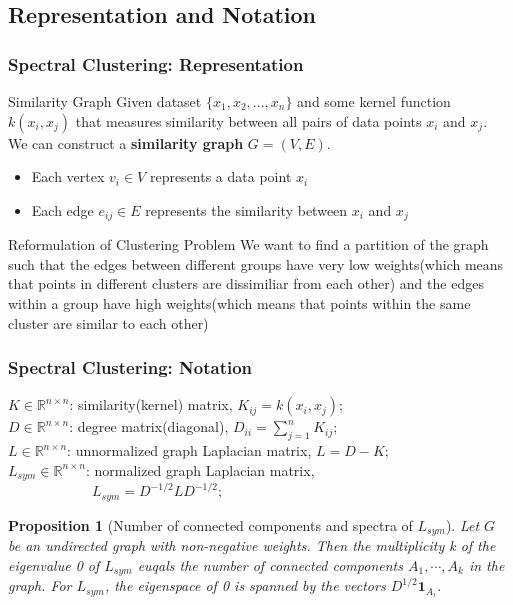 \documentclass{beamer}
\newtheorem{proposition}[theorem]{Proposition}
\begin{document}
\subsection{Representation and Notation}
\begin{frame}
\frametitle{Spectral Clustering: Representation}
\begin{block}{Similarity Graph}
Given dataset $\{x_1,x_2,..., x_n\}$ and some kernel function $k(x_i,x_j)$ that measures similarity between all pairs of data points $x_i$ and $x_j$.\\
We can construct a \textbf{similarity graph} $G=(V,E)$.\\
\begin{itemize}
	\item{Each vertex $v_i\in V$ represents a data point $x_i$}
	\item{Each edge $e_{ij}\in E$ represents the similarity between $x_i$ and $x_j$}
\end{itemize}
\end{block}
\begin{block}{Reformulation of Clustering Problem}
We want to find a partition of the graph such that the edges between different groups have very low weights(which means that points in different clusters are dissimiliar from each other) and the edges within a group have high weights(which means that points within the same cluster are similar to each other)
\end{block}
\end{frame}

\begin{frame}
\frametitle{Spectral Clustering: Notation}
$K\in \mathbb{R}^{n\times n}$: similarity(kernel) matrix, $K_{ij}=k(x_i,x_j)$;\\
$D\in \mathbb{R}^{n\times n}$: degree matrix(diagonal), $D_{ii}=\sum_{j=1}^{n}K_{ij}$;\\
$L\in \mathbb{R}^{n\times n}$: unnormalized graph Laplacian matrix, $L=D-K$;\\
$L_{sym}\in \mathbb{R}^{n\times n}$: normalized graph Laplacian matrix, \\
$\qquad\qquad\qquad L_{sym}=D^{-1/2}LD^{-1/2}$;\\

\begin{proposition}[Number of connected components and spectra of $L_{sym}$]
Let $G$ be an undirected graph with non-negative weights. Then the multiplicity k of the eigenvalue 0 of $L_{sym}$ euqals the number of connected components $A_1,\cdots,A_k$ in the graph. For $L_{sym}$, the eigenspace of 0 is spanned by the vectors $D^{1/2}\mathbf{1}_{A_i}$.
\end{proposition}
\end{frame}
\end{document}
